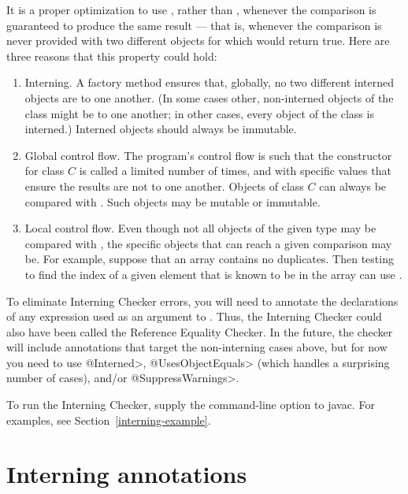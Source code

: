 It is a proper optimization to use \code{==}, rather than ,
whenever the comparison is guaranteed to produce the same result --- that
is, whenever the comparison is never provided with two different objects
for which  would return true.  Here are three reasons that
this property could hold:

\begin{enumerate}
\item
  Interning.  A factory method ensures that, globally, no two different
  interned objects are  to one another.  (In some cases
  other, non-interned objects of the class might be  to one
  another; in other cases, every object of the class is interned.)
  Interned objects should always be immutable.
\item
  Global control flow.  The program's control flow is such that the
  constructor for class $C$ is called a limited number of times, and with
  specific values that ensure the results are not  to one
  another.  Objects of class $C$ can always be compared with \code{==}.
  Such objects may be mutable or immutable.
\item
  Local control flow.  Even though not all objects of the given type may be
  compared with \code{==}, the specific objects that can reach a given
  comparison may be.  For example, suppose that an array contains no
  duplicates.  Then testing to find the index of a given element that is
  known to be in the array can use \code{==}.
\end{enumerate}

To eliminate Interning Checker errors, you will need to annotate the
declarations of any expression used as an argument to \code{==}.
Thus, the Interning Checker
could also have been called the Reference Equality Checker.  In the
future, the checker will include annotations that target the non-interning
cases above, but for now you need to use \<@Interned>, \<@UsesObjectEquals>
(which handles a surprising number of cases), and/or
\<@SuppressWarnings>.

To run the Interning Checker, supply the  command-line option to javac.  For
examples, see Section~\ref{interning-example}.


\section{Interning annotations\label{interning-annotations}}

